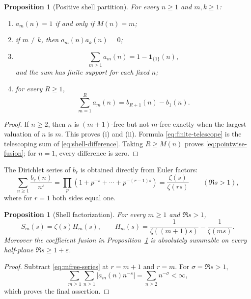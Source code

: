 \documentclass[11pt]{article}
\newtheorem{proposition}[theorem]{Proposition}
\theoremstyle{definition}
\theoremstyle{remark}
\begin{document}
\begin{proposition}[Positive shell partition]\label{prop:partition}
For every \(n\geq1\) and \(m,k\geq1\):
\begin{enumerate}[label=\textup{(\roman*)}]
\item \(a_m(n)=1\) if and only if \(M(n)=m\);
\item if \(m\ne k\), then \(a_m(n)a_k(n)=0\);
\item
\[
 \sum_{m\geq1}a_m(n)=1-\mathbf 1_{\{1\}}(n),
 \label{eq:pointwise-fusion}
 \tag{2.2}
\]
and the sum has finite support for each fixed \(n\);
\item for every \(R\geq1\),
\[
 \sum_{m=1}^{R}a_m(n)=b_{R+1}(n)-b_1(n).
 \label{eq:finite-telescope}
 \tag{2.3}
\]
\end{enumerate}
\end{proposition}

\begin{proof}
If \(n\geq2\), then \(n\) is \((m+1)\)-free but not \(m\)-free exactly when the largest
valuation of \(n\) is \(m\).  This proves (i) and (ii).  Formula \eqref{eq:finite-telescope}
is the telescoping sum of \eqref{eq:shell-difference}.  Taking
\(R\geq M(n)\) proves \eqref{eq:pointwise-fusion}; for \(n=1\), every difference is zero.
\end{proof}

The Dirichlet series of \(b_r\) is obtained directly from Euler factors:
\[
 \sum_{n\geq1}\frac{b_r(n)}{n^s}
 =\prod_p(1+p^{-s}+\cdots+p^{-(r-1)s})
 =\frac{\zeta(s)}{\zeta(rs)}
 \qquad(\Re s>1),
 \label{eq:mfree-series}
 \tag{2.4}
\]
where for \(r=1\) both sides equal one.

\begin{proposition}[Shell factorization]\label{prop:factor}
For every \(m\geq1\) and \(\Re s>1\),
\begin{equation}\label{eq:factor}
 S_m(s)=\zeta(s)H_m(s),\qquad
 H_m(s)=\frac1{\zeta((m+1)s)}-\frac1{\zeta(ms)}.
 \tag{2.5}
\end{equation}
Moreover the coefficient fusion in Proposition~\ref{prop:partition} is absolutely summable on
every half-plane \(\Re s\geq1+\varepsilon\).
\end{proposition}

\begin{proof}
Subtract \eqref{eq:mfree-series} at \(r=m+1\) and \(r=m\).  For
\(\sigma=\Re s>1\),
\[
 \sum_{m\geq1}\sum_{n\geq1}|a_m(n)n^{-s}|
 =\sum_{n\geq2}n^{-\sigma}<\infty,
\]
which proves the final assertion.
\end{proof}
\end{document}
